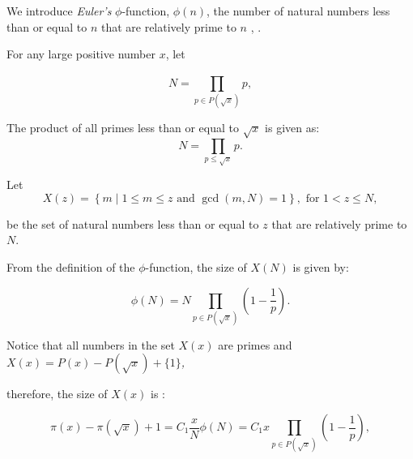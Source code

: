 \documentclass{article}
\begin{document}
We introduce \textit{Euler's} \( \phi \)-function, \( \phi (n) \), the number of natural numbers less than or equal to \( n \) that are relatively prime to \( n \) \cite{2}, \cite{1}.

\vspace{1\baselineskip}

For any large positive number \( x \), let 

\begin{equation}
N = \prod_{p\in P\left(\sqrt{x}\right)}^{}p  ,
\end{equation}

\vspace{1\baselineskip}

The product of all primes less than or equal to \(\sqrt{x}\) is given as:
\begin{equation}
N = \prod_{p \leq \sqrt{x}} p.
\end{equation}
\vspace{1\baselineskip}

Let
\begin{equation}
X(z) = \left\{ m \mid 1 \leq m \leq z \text{ and } \gcd(m,N) = 1 \right\}, \text{ for } 1 < z \leq N,
\end{equation}
\vspace{1\baselineskip}

be the set of natural numbers less than or equal to \(z\) that are relatively prime to \(N\).

\vspace{1\baselineskip}

From the definition of the \( \phi \)-function, the size of \( X(N) \) is given by:

\begin{equation}
\phi\left(N\right) = N\prod_{p\in P\left(\sqrt{x}\right)}^{}(1-\frac{1}{p} )  .
\end{equation}
\vspace{1\baselineskip}

 Notice that all numbers in the set \( X\left(x\right)\) are primes and \( X\left(x\right) = P\left(x\right)- P\left(\sqrt{x}\right)+\{ 1\}\)\textit{,}

 therefore, the { size of }\( X\left(x\right)\) is {:}

\begin{equation}
\pi\left(x\right)-\pi\left(\sqrt{x}\right)+1 = C_{1}\frac{x}{N} \phi\left(N\right) = C_{1}x\prod_{p\in P\left(\sqrt{x}\right)}^{}(1-\frac{1}{p} ) ,
\end{equation}
\vspace{1\baselineskip}
\end{document}
